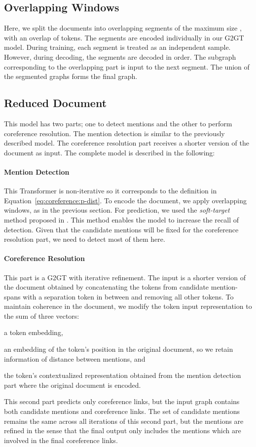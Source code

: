 \documentclass[11pt]{article}
\begin{document}
\subsection{Overlapping Windows}
Here, we split the documents into overlapping segments of the maximum size , with an overlap of  tokens. The segments are encoded individually in our G2GT model. During training, each segment is treated as an independent sample. However, during decoding, the segments are decoded in order. The subgraph corresponding to the overlapping part is input to the next segment. 
The union of the segmented graphs forms the final graph.         

\subsection{Reduced Document}
This model has two parts; one to detect mentions and the other to perform coreference resolution. The mention detection is similar to the previously described model. The coreference resolution part receives a shorter version of the document as input. The complete model is described in the following:
\paragraph{Mention Detection} This Transformer is non-iterative so it corresponds to the definition in Equation~\eqref{eq:coreference:p-dist}. To encode the document, we apply overlapping windows, as in the previous section. For prediction, we used the \emph{soft-target} method proposed in \cite{miculicich-henderson-2020-partially}. This method enables the model to increase the recall of detection. 
	Given that the candidate mentions will be fixed for the coreference resolution part, we need to detect most of them here. 
\paragraph{Coreference Resolution} This part is a G2GT with iterative refinement. The input is a shorter version of the document obtained by concatenating the tokens from candidate mention-spans with a separation token in between and removing all other tokens. To maintain coherence in the document, we modify the token input representation to the sum of three vectors:
	\begin{enumerate*}[(\alph*)]
		\item a token embedding,
		\item an embedding of the token's position in the original document, so we retain information of distance between mentions, and
		\item the token's contextualized representation obtained from the mention detection part where the original document is encoded.
	\end{enumerate*}
This second part predicts only coreference links, but the input graph contains both candidate mentions and coreference links.  The set of candidate mentions remains the same across all iterations of this second part, but the mentions are refined in the sense that the final output only includes the mentions which are involved in the final coreference links.
\end{document}
